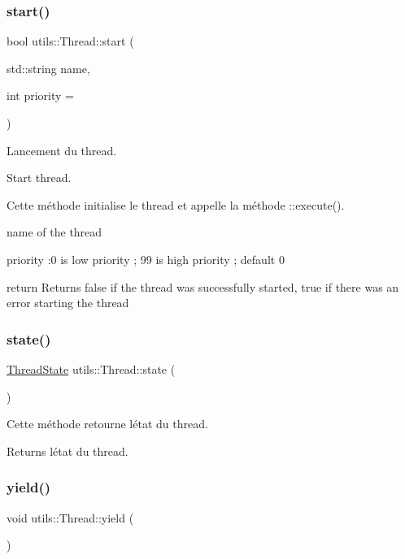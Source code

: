 \subsubsection{\texorpdfstring{start()}{start()}}
{\footnotesize\ttfamily bool utils\+::\+Thread\+::start (\begin{DoxyParamCaption}\item[{std\+::string}]{name,  }\item[{int}]{priority = {} }\end{DoxyParamCaption})}



Lancement du thread. 

Start thread.

Cette méthode initialise le thread et appelle la méthode \+::execute().

name of the thread

priority \+:0 is low priority ; 99 is high priority ; default 0

return Returns false if the thread was successfully started, true if there was an error starting the thread \mbox{\label{classutils_1_1Thread_ada9233f3e669c925e9ed518201ad31cd}} 
\subsubsection{\texorpdfstring{state()}{state()}}
{\footnotesize\ttfamily \hyperlink{Thread_8hpp_a504e3834817aefe4aa5d0403791dd269}{Thread\+State} utils\+::\+Thread\+::state (\begin{DoxyParamCaption}{ }\end{DoxyParamCaption})\hspace{0.3cm}{\ttfamily [inline]}}



Cette méthode retourne l\textquotesingle{}état du thread. 

\begin{DoxyReturn}{Returns}
l\textquotesingle{}état du thread. 
\end{DoxyReturn}
\mbox{\label{classutils_1_1Thread_a2535cf3474384aad6621c0556813097f}} 
\subsubsection{\texorpdfstring{yield()}{yield()}}
{\footnotesize\ttfamily void utils\+::\+Thread\+::yield (\begin{DoxyParamCaption}{ }\end{DoxyParamCaption})\hspace{0.3cm}{\ttfamily [protected]}}



